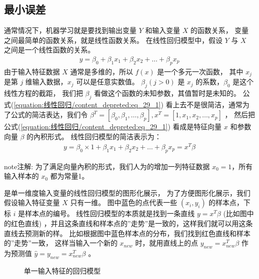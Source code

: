 \documentclass[letterpaper,10pt,english]{sphinxmanual}
\begin{document}
\subsection{最小误差}
\label{\detokenize{_u7ebf_u6027_u56de_u5f52/content:id3}}
通常情况下，机器学习就是要找到输出变量 \(Y\) 和输入变量 \(X\) 的函数关系，
变量之间最简单的函数关系，就是线性函数关系。
在线性回归模型中，假设 \(Y\) 与 \(X\) 之间是一个线性函数的关系。
\begin{equation}\label{equation:线性回归/content:eq_29_1}
\begin{split}y = \beta_0+ \beta_1 x_1 +\beta_2 x_2+\dots+ \beta_p x_p\end{split}
\end{equation}
由于输入特征数据 \(X\) 通常是多维的，所以 \(f(x)\) 是一个多元一次函数，
其中 \(x_j\) 是第 \(j\) 维输入数据，\(x_j\) 可以是任意实数值。
\(\beta_j (j > 0)\) 是 \(x_j\) 的系数，\(\beta_0\) 是这个线性方程的截距，
我们把 \(\beta_j\) 看做这个函数的未知参数，其值暂时是未知的。
公式(\ref{equation:线性回归/content_depreted:eq_29_1}) 看上去不是很简洁，通常为了公式的简洁表达，我们令
\(\beta^T=[\beta_0,\beta_1,\dots,\beta_p],x^T=[1,x_1,x_2,\dots,x_p]\) ，
然后把 公式(\ref{equation:线性回归/content_depreted:eq_29_1}) 看成是特征向量 \(x\) 和参数向量 \(\beta\) 的內积形式。
线性回归模型的简洁表示为：
\begin{equation}\label{equation:线性回归/content:线性回归/content:0}
\begin{split}y =  \beta_0 \times 1 + \beta_1x_1 +\beta_2 x_2+\dots+\beta_p x_p
= x^T \beta\end{split}
\end{equation}
\begin{sphinxadmonition}{note}{注解:}
为了满足向量內积的形式，我们人为的增加一列特征数据 \(x_0=1\)，所有输入样本的 \(x_0\) 都为常量1。
\end{sphinxadmonition}

 是单一维度输入变量的线性回归模型的图形化展示，
为了方便图形化展示，我们假设输入特征变量 \(X\) 只有一维。
图中蓝色的点代表一些 \((x_i,y_i)\) 的样本点，下标 \(i\) 是样本点的编号。
线性回归模型的本质就是找到一条直线 \(y=x^T \beta\) (比如图中的红色直线)
，并且这条直线和样本点的”走势”是一致的，这样我们就可以用这条直线去预测新的样。
比如根据图中蓝色样本点的分布，我们找到红色直线和样本的”走势”一致，
这样当输入一个新的 \(x_{new}\) 时，就用直线上的点 \(y_{new}=x_{new}^T \beta\)
作为预测值 \(\hat{y}=y_{new}=x_{new}^T \beta\) 。

\begin{figure}[htbp]
\centering
\capstart

\noindent{}
\caption{单一输入特征的回归模型}\label{\detokenize{_u7ebf_u6027_u56de_u5f52/content:id8}}\label{\detokenize{_u7ebf_u6027_u56de_u5f52/content:fg-29-1}}\end{figure}
\end{document}
